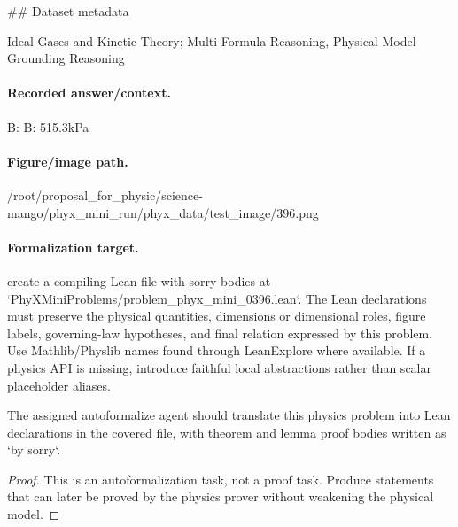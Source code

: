\#\# Dataset metadata

Ideal Gases and Kinetic Theory; Multi-Formula Reasoning, Physical Model Grounding Reasoning

\paragraph{Recorded answer/context.}
B: B: 515.3kPa

\paragraph{Figure/image path.}
/root/proposal\_for\_physic/science-mango/phyx\_mini\_run/phyx\_data/test\_image/396.png

\paragraph{Formalization target.}
create a compiling Lean file with sorry bodies at `PhyXMiniProblems/problem\_phyx\_mini\_0396.lean`. The Lean declarations must preserve the physical quantities, dimensions or dimensional roles, figure labels, governing-law hypotheses, and final relation expressed by this problem.
Use Mathlib/Physlib names found through LeanExplore where available. If a physics API is missing, introduce faithful local abstractions rather than scalar placeholder aliases.

\begin{theorem}
\label{thm:physics:phyx_mini_0396:target}
The assigned autoformalize agent should translate this physics problem into Lean declarations in the covered file, with theorem and lemma proof bodies written as `by sorry`.
\end{theorem}
\begin{proof}
This is an autoformalization task, not a proof task. Produce statements that can later be proved by the physics prover without weakening the physical model.
\end{proof}

